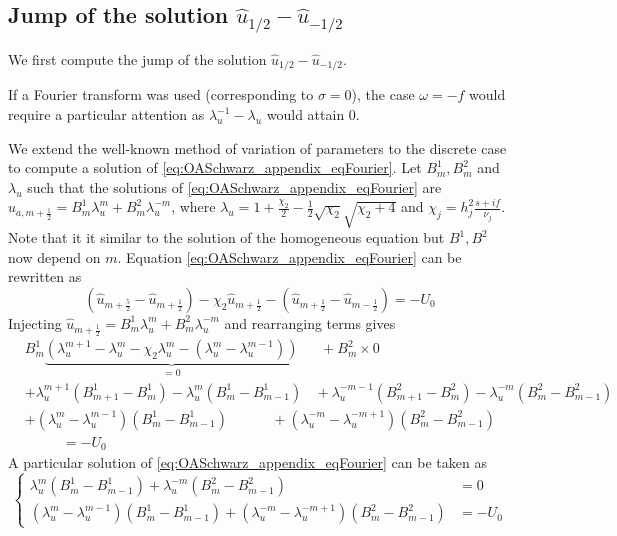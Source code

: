 \subsection{Jump of the solution
	$\widehat{u}_{1/2} - \widehat{u}_{-1/2}$}
We first compute the jump of the solution
$\widehat{u}_{1/2} - \widehat{u}_{-1/2}$.
\begin{remark}
	If a Fourier transform was used
	(corresponding to $\sigma=0$), the case $\omega=-f$ would
	require a particular attention as
	$\lambda_u^{-1} - \lambda_u$ would attain 0.
\end{remark}
We extend the well-known method of variation of parameters to the
discrete case to compute a solution of
\eqref{eq:OASchwarz_appendix_eqFourier}.
Let $B_m^1, B_m^2$ and $\lambda_u$ such that
the solutions of \eqref{eq:OASchwarz_appendix_eqFourier} are
$\widehat{u}_{a,m+\frac{1}{2}} = B^1_m \lambda_u^m + B^2_m \lambda_u^{-m}$, where
$\lambda_u=1+\frac{\chi_2}{2}
-\frac{1}{2}\sqrt{\chi_2}\sqrt{\chi_2+4}$ and
$\chi_j = h_j^2 \frac{s + if}{\nu_j}$.
Note that it it similar to the solution of the homogeneous
equation but $B^1, B^2$ now depend on $m$.
	Equation \eqref{eq:OASchwarz_appendix_eqFourier}
	can be rewritten as
	\begin{equation}
		(\widehat{u}_{m+\frac{5}{2}} - \widehat{u}_{m+\frac{1}{2}})
		-\chi_2 \widehat{u}_{m+\frac{1}{2}}
		- (\widehat{u}_{m+\frac{1}{2}} - \widehat{u}_{m-\frac{1}{2}})
		= -U_0
	\end{equation}
	Injecting $\widehat{u}_{m+\frac{1}{2}} = B^1_m \lambda_u^m +
	B^2_m \lambda_u^{-m}$ and rearranging terms gives
\begin{equation}
	\begin{aligned}
	&B^1_m \underbrace{\left(
		\lambda_u^{m+1} - \lambda_u^m - \chi_2 \lambda_u^m
		- (\lambda_u^{m} - \lambda_u^{m-1})
		\right)}_{=0} ~~~~~~~+ B^2_m \times 0 \\
	&+ \lambda_u^{m+1} (B_{m+1}^1 - B_m^1)
		- \lambda_u^{m} (B_{m}^1 - B_{m-1}^1)
		~~~~+ \lambda_u^{-m-1} (B_{m+1}^2 - B_m^2)
		- \lambda_u^{-m} (B_{m}^2 - B_{m-1}^2)
		\\
	&+ (\lambda_u^m - \lambda_u^{m-1})(B_{m}^1 - B_{m-1}^1)
		~~~~~~~~~~~~~~+ (\lambda_u^{-m} - \lambda_u^{-m+1})
				(B_{m}^2 - B_{m-1}^2)\\
		&~~~~~~~~~~~~= -U_0
	\end{aligned}
\end{equation}
A particular solution of \eqref{eq:OASchwarz_appendix_eqFourier}
can be taken as
\begin{equation}
\begin{cases}
	\lambda_u^m(B_m^1 - B_{m-1}^1)
	+ \lambda_u^{-m}(B_m^2 - B_{m-1}^2)&= 0 \\
	(\lambda_u^m - \lambda_u^{m-1})(B_m^1 - B_{m-1}^1)
	+ (\lambda_u^{-m} - \lambda_u^{-m+1})(B_m^2 - B_{m-1}^2)
	&= -{U_0}
\end{cases}
\end{equation}
